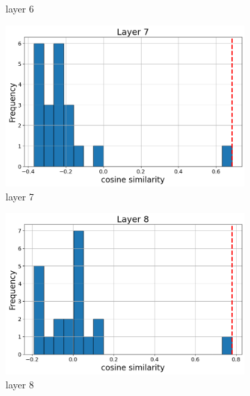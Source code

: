 \documentclass[11pt]{article}
\begin{document}
\begin{figure}[t]
\begin{subfigure}[t]{0.24\textwidth}
    \caption{layer 6}
  \end{subfigure}\hfill
    \vspace{2mm}

    \begin{subfigure}[t]{0.24\textwidth}
    \centering
    \includegraphics[width=1.4\columnwidth]{figures/obs2_appendix/obs2_layer7.png}
    \caption{layer 7}
  \end{subfigure}\hfill
      \begin{subfigure}[t]{0.24\textwidth}
    \centering
    \includegraphics[width=1.4\columnwidth]{figures/obs2_appendix/obs2_layer8.png}
    \caption{layer 8}
  \end{subfigure}\hfill
      \begin{subfigure}[t]{0.24\textwidth}
    \centering

\end{subfigure}
\end{figure}
\end{document}
